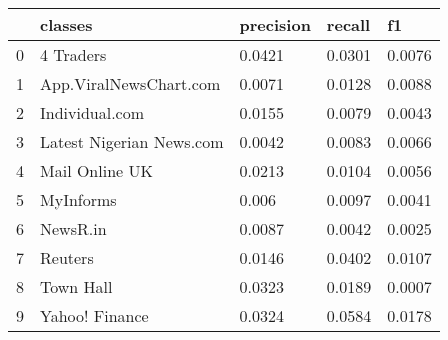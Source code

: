 \begin{tabular}{lllll}
\toprule
{} &                   classes & precision &  recall &      f1 \\
\midrule
0 &                 4 Traders &    0.0421 &  0.0301 &  0.0076 \\
1 &    App.ViralNewsChart.com &    0.0071 &  0.0128 &  0.0088 \\
2 &            Individual.com &    0.0155 &  0.0079 &  0.0043 \\
3 &  Latest Nigerian News.com &    0.0042 &  0.0083 &  0.0066 \\
4 &            Mail Online UK &    0.0213 &  0.0104 &  0.0056 \\
5 &                 MyInforms &     0.006 &  0.0097 &  0.0041 \\
6 &                  NewsR.in &    0.0087 &  0.0042 &  0.0025 \\
7 &                   Reuters &    0.0146 &  0.0402 &  0.0107 \\
8 &                 Town Hall &    0.0323 &  0.0189 &  0.0007 \\
9 &            Yahoo! Finance &    0.0324 &  0.0584 &  0.0178 \\
\bottomrule
\end{tabular}
